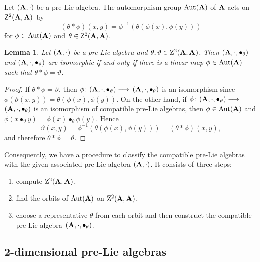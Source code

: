 \documentclass[10pt,a4paper]{amsart}
\numberwithin{equation}{section}
\newtheorem{Lemma}[Theorem]{Lemma}
\begin{document}
Let $( {\bf A},\cdot ) $ be a pre-Lie
algebra. The automorphism group ${\rm Aut}( {\bf A}) $
of ${\bf A}$ acts on ${\rm Z}^{2}( {\bf A},{\bf A}) $~by
\[
(\theta *\phi) ( x,y) =\phi ^{-1}( \theta ( \phi (
x) ,\phi ( y) ) )
\]
for $\phi \in {\rm Aut}
( {\bf A}) $ and $\theta \in {\rm Z}^{2}( {\bf A}, {\bf A}) $.

\begin{Lemma}
\label{isom}Let $( {\bf A},\cdot ) $ be a pre-Lie algebra
and $\theta ,\vartheta \in {\rm Z}^{2}( {\bf A},{\bf A}) $.
Then $( {\bf A},\cdot ,\bullet_{\theta }) $ and $%
( {\bf A},\cdot ,\bullet_{\vartheta }) $ are
isomorphic if and only if there is a linear map $\phi \in {\rm Aut}( {\bf A}
)$ such that $\theta *\phi =\vartheta $.
\end{Lemma}

\begin{proof}
If $\theta * \phi =\vartheta $, then $\phi \colon( {\bf A},\cdot ,\bullet_{\vartheta }) \longrightarrow $ $( {\bf A},\cdot
,\bullet_{\theta }) $ is an isomorphism since
$\phi
( \vartheta ( x,y) ) =\theta ( \phi (
x) ,\phi ( y) ) $. On the other hand, if $\phi
\colon( {\bf A},\cdot ,\bullet_{\vartheta })
\longrightarrow $ $( {\bf A},\cdot ,\bullet _{\theta
}) $ is an isomorphism of compatible pre-Lie algebras, then $\phi \in {\rm Aut}%
( {\bf A}) $ and $\phi ( x\bullet _{\vartheta
}y ) = \phi ( x) \bullet _{\theta } \phi ( y)
 $. Hence
 \[
 \vartheta ( x,y) =\phi ^{-1}( \theta
( \phi ( x) ,\phi ( y) ) ) =(\theta *
\phi )( x,y),
 \]
 and therefore $\theta * \phi=\vartheta $.
\end{proof}


Consequently, we have a procedure to classify the compatible pre-Lie algebras with the given
associated pre-Lie algebra $( {\bf A},\cdot )
$. It consists of three steps:
\begin{enumerate}\itemsep=0pt
\item[(1)] compute ${\rm Z}^{2}( {\bf A},{\bf A}) $,
\item[(2)] find the orbits of ${\rm Aut}( {\bf A}) $ on $%
{\rm Z}^{2}( {\bf A},{\bf A}) $,
\item[(3)] choose a representative $\theta$ from each orbit and then construct the compatible pre-Lie algebra $( {\bf A},\cdot,\bullet _{\theta }) $.
\end{enumerate}

\subsection{2-dimensional pre-Lie algebras}
\end{document}
